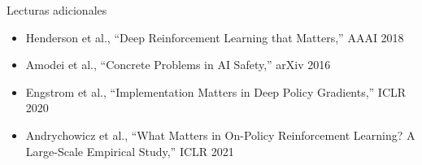 \documentclass[a4paper]{article}
\begin{document}
\begin{knowledgebox}{Lecturas adicionales}
\begin{itemize}
    \item Henderson et al., ``Deep Reinforcement Learning that Matters,'' AAAI 2018
    \item Amodei et al., ``Concrete Problems in AI Safety,'' arXiv 2016
    \item Engstrom et al., ``Implementation Matters in Deep Policy Gradients,'' ICLR 2020
    \item Andrychowicz et al., ``What Matters in On-Policy Reinforcement Learning? A Large-Scale Empirical Study,'' ICLR 2021
\end{itemize}
\end{knowledgebox}
\end{document}
